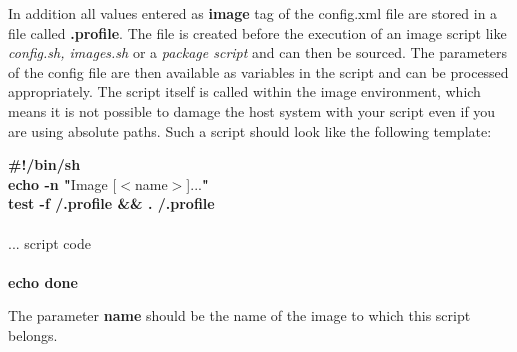 In addition all values entered as \textbf{image} tag of the config.xml
file are stored in a file called \textbf{.profile}. The file is created
before the execution of an image script like \textit{config.sh, images.sh}
or a \textit{package script} and can then be sourced. The parameters
of the config file are then available as variables in the
script and can be processed appropriately. The script itself is called
within the image environment, which means it
is not possible to damage the host system with your script even if you
are using absolute paths. Such a script should look like the following
template:

\begin{Command}{9cm}
\textbf{\#!/bin/sh}\\
\textbf{echo -n "}Image [$<$name$>$]...\textbf{"}\\
\textbf{test -f /.profile \&\& . /.profile}\\
\\
... script code\\
\\
\textbf{echo done}
\end{Command}

The parameter \textbf{name} should be the name of the image to which this
script belongs.

